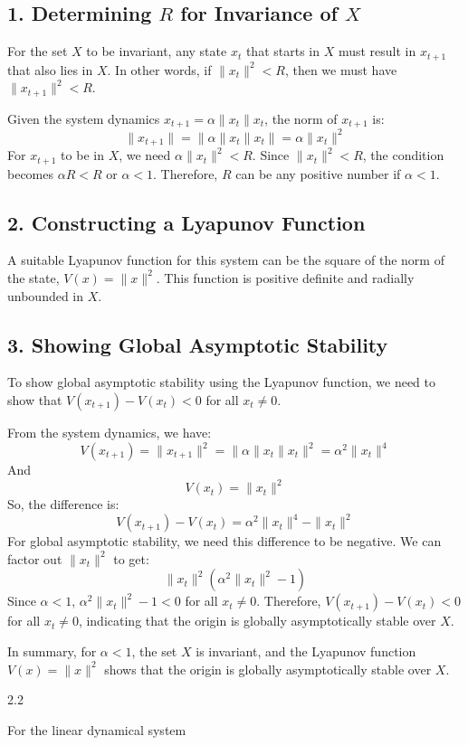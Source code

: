 \documentclass{article}
\begin{document}
\subsection*{1. Determining \(R\) for Invariance of \(X\)}
For the set \(X\) to be invariant, any state \(x_t\) that starts in \(X\) must result in \(x_{t+1}\) that also lies in \(X\). In other words, if \(\|x_t\|^2 < R\), then we must have \(\|x_{t+1}\|^2 < R\).

Given the system dynamics \(x_{t+1} = \alpha \|x_t\| x_t\), the norm of \(x_{t+1}\) is:
\[
\|x_{t+1}\| = \|\alpha \|x_t\| x_t\| = \alpha \|x_t\|^2
\]
For \(x_{t+1}\) to be in \(X\), we need \(\alpha \|x_t\|^2 < R\). Since \(\|x_t\|^2 < R\), the condition becomes \(\alpha R < R\) or \(\alpha < 1\). Therefore, \(R\) can be any positive number if \(\alpha < 1\).

\subsection*{2. Constructing a Lyapunov Function}
A suitable Lyapunov function for this system can be the square of the norm of the state, \(V(x) = \|x\|^2\). This function is positive definite and radially unbounded in \(X\).

\subsection*{3. Showing Global Asymptotic Stability}
To show global asymptotic stability using the Lyapunov function, we need to show that \(V(x_{t+1}) - V(x_t) < 0\) for all \(x_t \neq 0\).

From the system dynamics, we have:
\[
V(x_{t+1}) = \|x_{t+1}\|^2 = \|\alpha \|x_t\| x_t\|^2 = \alpha^2 \|x_t\|^4
\]
And
\[
V(x_t) = \|x_t\|^2
\]
So, the difference is:
\[
V(x_{t+1}) - V(x_t) = \alpha^2 \|x_t\|^4 - \|x_t\|^2
\]
For global asymptotic stability, we need this difference to be negative. We can factor out \(\|x_t\|^2\) to get:
\[
\|x_t\|^2 (\alpha^2 \|x_t\|^2 - 1)
\]
Since \(\alpha < 1\), \(\alpha^2 \|x_t\|^2 - 1 < 0\) for all \(x_t \neq 0\). Therefore, \(V(x_{t+1}) - V(x_t) < 0\) for all \(x_t \neq 0\), indicating that the origin is globally asymptotically stable over \(X\).

In summary, for \(\alpha < 1\), the set \(X\) is invariant, and the Lyapunov function \(V(x) = \|x\|^2\) shows that the origin is globally asymptotically stable over \(X\).


2.2

For the linear dynamical system 
\end{document}
